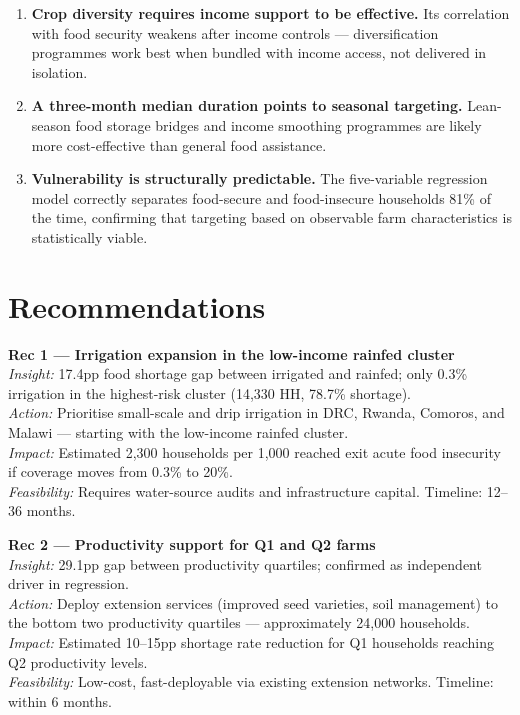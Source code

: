 \documentclass[11pt,a4paper]{article}
\begin{document}
\begin{enumerate}
  \item \textbf{Crop diversity requires income support to be effective.} Its correlation with food security weakens after income controls — diversification programmes work best when bundled with income access, not delivered in isolation.

  \item \textbf{A three-month median duration points to seasonal targeting.} Lean-season food storage bridges and income smoothing programmes are likely more cost-effective than general food assistance.

  \item \textbf{Vulnerability is structurally predictable.} The five-variable regression model correctly separates food-secure and food-insecure households 81\% of the time, confirming that targeting based on observable farm characteristics is statistically viable.

\end{enumerate}

\newpage

\section{Recommendations}

\begin{findingbox}
\textbf{Rec 1 — Irrigation expansion in the low-income rainfed cluster}\\[4pt]
\textit{Insight:} 17.4pp food shortage gap between irrigated and rainfed; only 0.3\% irrigation in the highest-risk cluster (14,330 HH, 78.7\% shortage).\\[3pt]
\textit{Action:} Prioritise small-scale and drip irrigation in DRC, Rwanda, Comoros, and Malawi — starting with the low-income rainfed cluster.\\[3pt]
\textit{Impact:} Estimated 2,300 households per 1,000 reached exit acute food insecurity if coverage moves from 0.3\% to 20\%.\\[3pt]
\textit{Feasibility:} Requires water-source audits and infrastructure capital. Timeline: 12--36 months.
\end{findingbox}

\vspace{7pt}

\begin{findingbox}
\textbf{Rec 2 — Productivity support for Q1 and Q2 farms}\\[4pt]
\textit{Insight:} 29.1pp gap between productivity quartiles; confirmed as independent driver in regression.\\[3pt]
\textit{Action:} Deploy extension services (improved seed varieties, soil management) to the bottom two productivity quartiles — approximately 24,000 households.\\[3pt]
\textit{Impact:} Estimated 10--15pp shortage rate reduction for Q1 households reaching Q2 productivity levels.\\[3pt]
\textit{Feasibility:} Low-cost, fast-deployable via existing extension networks. Timeline: within 6 months.
\end{findingbox}
\end{document}
